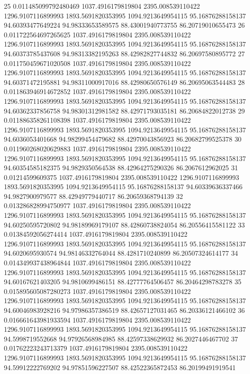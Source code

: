 {25 0.011485099792480469 1037.4916179819804 2395.008539110422 1296.9107116899993 1893.5691820353995 1094.9213649954115 95.16876288158137 94.60393477649224 94.98333653589575 88.43001940773755 86.20719010655473
26 0.011722564697265625 1037.4916179819804 2395.008539110422 1296.9107116899993 1893.5691820353995 1094.9213649954115 95.16876288158137 94.60373785437608 94.98313382195263 88.42982827744832 86.20697580895772
27 0.011750459671020508 1037.4916179819804 2395.008539110422 1296.9107116899993 1893.5691820353995 1094.9213649954115 95.16876288158137 94.60371472195881 94.98311000917016 88.42980650576149 86.20695063544483
28 0.011863946914672852 1037.4916179819804 2395.008539110422 1296.9107116899993 1893.5691820353995 1094.9213649954115 95.16876288158137 94.60362337856758 94.98301312981582 88.42971793035181 86.20684822012738
29 0.011886358261108398 1037.4916179819804 2395.008539110422 1296.9107116899993 1893.5691820353995 1094.9213649954115 95.16876288158137 94.6036053401668 94.98299454479682 88.42970043856923 86.20682799525378
30 0.011960268020629883 1037.4916179819804 2395.008539110422 1296.9107116899993 1893.5691820353995 1094.9213649954115 95.16876288158137 94.60354585182375 94.9829350564538 88.42964275290326 86.2067612962025
31 0.01214599609375 1037.4916179819804 2395.008539110422 1296.9107116899993 1893.5691820353995 1094.9213649954115 95.16876288158137 94.60339636337466 94.9827900979577 88.42949779440717 86.20659368794139
32 0.013286828994750977 1037.4916179819804 2395.008539110422 1296.9107116899993 1893.5691820353995 1094.9213649954115 95.16876288158137 94.60250595720802 94.98189969179107 88.42860738824054 86.20556415581122
33 0.01384592056274414 1037.4916179819804 2395.008539110422 1296.9107116899993 1893.5691820353995 1094.9213649954115 95.16876288158137 94.6020695930574 94.98146332764044 88.4281710240899 86.20507324614177
34 0.014349937438964844 1037.4916179819804 2395.008539110422 1296.9107116899993 1893.5691820353995 1094.9213649954115 95.16876288158137 94.60167621403205 94.9810699486151 88.42777764506457 86.20464298783278
35 0.015895605087280273 1037.4916179819804 2395.008539110422 1296.9107116899993 1893.5691820353995 1094.9213649954115 95.16876288158137 94.60046983928216 94.97986357386519 88.42657127031465 86.20336121466102
36 0.016661643981933594 1037.4916179819804 2395.008539110422 1296.9107116899993 1893.5691820353995 1094.9213649954115 95.16876288158137 94.5998719552668 94.97926568984985 88.42597338629932 86.2027446467702
37 0.01762223243713379 1037.4916179819804 2395.008539110422 1296.9107116899993 1893.5691820353995 1094.9213649954115 95.16876288158137 94.59912222769202 94.97851596227507 88.42522365872453 86.20199491919541
}
